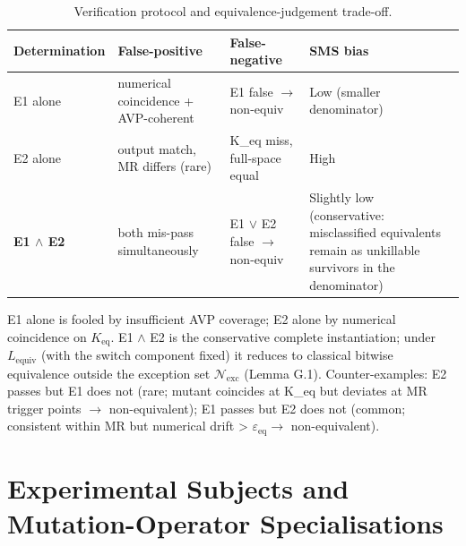 \documentclass[manuscript,screen,review]{acmart}
\begin{document}
{%
\begin{longtable}[]{@{}
  >{\raggedright\arraybackslash}p{}
  >{\raggedright\arraybackslash}p{}
  >{\raggedright\arraybackslash}p{}
  >{\raggedright\arraybackslash}p{}@{}}
\caption{Verification protocol and equivalence-judgement trade-off.}\label{tab:p2-16}\\
\toprule\noalign{}
\begin{minipage}[b]{\linewidth}\raggedright
Determination
\end{minipage} & \begin{minipage}[b]{\linewidth}\raggedright
False-positive
\end{minipage} & \begin{minipage}[b]{\linewidth}\raggedright
False-negative
\end{minipage} & \begin{minipage}[b]{\linewidth}\raggedright
SMS bias
\end{minipage} \\
\midrule\noalign{}
\endfirsthead
\endhead
\bottomrule\noalign{}
\endlastfoot
E1 alone & numerical coincidence + AVP-coherent & E1 false $\to$ non-equiv &
Low (smaller denominator) \\
E2 alone & output match, MR differs (rare) & K\_eq miss, full-space
equal & High \\
\textbf{E1 $\wedge$ E2} & both mis-pass simultaneously & E1 $\vee$ E2 false $\to$ non-equiv
& Slightly low (conservative: misclassified equivalents remain as
unkillable survivors in the denominator) \\
\end{longtable}
}

E1 alone is fooled by insufficient AVP coverage; E2 alone by numerical
coincidence on $K_{\mathrm{eq}}$. E1 $\wedge$ E2 is the conservative complete
instantiation; under $L_{\mathrm{equiv}}$ (with the switch component
fixed) it reduces to
classical bitwise equivalence outside the exception set
$\mathcal{N}_{\mathrm{exc}}$ (Lemma G.1). Counter-examples: E2 passes
but E1 does not (rare; mutant coincides at K\_eq but deviates at MR
trigger points $\to$ non-equivalent); E1 passes but E2 does not (common;
consistent within MR but numerical drift \textgreater{} $\varepsilon_{\mathrm{eq}} \to$
non-equivalent).


\section{Experimental Subjects and Mutation-Operator Specialisations}\label{b.-experimental-subjects-and-mutation-operator-specialisations}
\end{document}
